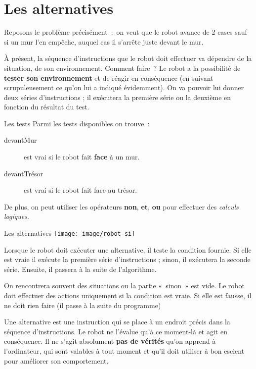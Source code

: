 \section{Les alternatives }

	Reposons le problème précisément~:~on veut que le robot avance de 2
	cases sauf si un mur l’en empêche, auquel cas il
	s’arrête juste devant le mur.
	
	À présent, la séquence d’instructions que le robot doit
	effectuer va dépendre de la situation, de son environnement. Comment
	faire~? Le robot a la possibilité de \textbf{tester son environnement}
	et de réagir en conséquence (en suivant scrupuleusement ce
	qu’on lui a indiqué évidemment). On va pouvoir lui
	donner deux séries d’instructions ; il exécutera la
	première série ou la deuxième en fonction du résultat du test.

	\begin{Emphase}[definition]{Les tests}
	Parmi les tests disponibles on trouve~:
	
		\begin{description}
		\item[devantMur]
			est vrai si le robot fait \textbf{face} à un mur.
		\item[devantTrésor]
			est vrai si le robot fait face au trésor.
		\end{description}
	\end{Emphase}

	De plus, on peut utiliser les opérateurs \textbf{non}, \textbf{et}, 
	\textbf{ou} pour effectuer des \emph{calculs logiques}.
	
	\begin{Emphase}[definition]{Les alternatives}
	\texttt{[image: image/robot-si]}
	\end{Emphase}

	Lorsque le robot doit exécuter une alternative, il teste la condition
	fournie. Si elle est vraie il exécute la première série
	d’instructions ; sinon, il exécutera la seconde série.
	Ensuite, il passera à la suite de l’algorithme.

	On rencontrera souvent des situations ou la partie «~sinon~» est vide.
	Le robot doit effectuer des actions uniquement si la condition est
	vraie. Si elle est fausse, il ne doit rien faire (il passe à la suite
	du programme)

	Une alternative est une instruction qui se place à un endroit précis
	dans la séquence d’instructions. Le robot ne
	l’évalue qu’à ce moment-là et agit en
	conséquence. Il ne s’agit absolument \textbf{pas de
	vérités} qu’on apprend à
	l’ordinateur, qui sont valables à tout moment et
	qu’il doit utiliser à bon escient pour améliorer son
	comportement.

